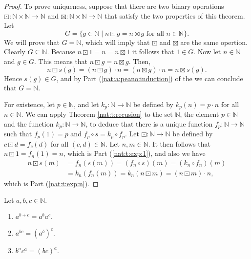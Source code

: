 \begin{proof}
	To prove uniqueness, suppose that there are two binary operations $\boxdot: \mathbb{N} \times \mathbb{N} \to \mathbb{N}$ and $\boxtimes: \mathbb{N} \times \mathbb{N} \to \mathbb{N}$ that satisfy the two properties of this theorem. Let
	\[
		G = \{ g \in \mathbb{N} \mid n \boxdot g = n \boxtimes g \text{ for all } n \in \mathbb{N} \}.
	\]
	We will prove that $G = \mathbb{N}$, which will imply that $\boxdot$ and $\boxtimes$ are the same opertion. Clearly $G \subseteq \mathbb{N}$. Because $n \boxdot 1 = n = n \boxtimes 1$ it follows that $1 \in G$. Now let $n \in \mathbb{N}$ and $g \in G$. This means that $n \boxdot g = n \boxtimes g$. Then,
	\[
		n \boxdot s(g) = (n \boxdot g) \cdot n = (n \boxtimes g) \cdot n = n \boxtimes s(g).
	\]
	Hence $s(g) \in G$, and by Part (\ref{nat:a:peano:induction}) of the  we can conclude that $G = \mathbb{N}$.

	For existence, let $p \in \mathbb{N}$, and let $k_{p}: \mathbb{N} \to \mathbb{N}$ be defined by $k_{p}(n) = p \cdot n$ for all $n \in \mathbb{N}$. We can apply Theorem \ref{nat:t:recusion} to the set $\mathbb{N}$, the element $p \in \mathbb{N}$ and the function $k_{p}: \mathbb{N} \to \mathbb{N}$, to deduce that there is a unique function $f_{p}: \mathbb{N} \to \mathbb{N}$ such that $f_{p}(1) = p$ and $f_{p} \circ s = k_{p} \circ f_{p}$. Let $\boxdot: \mathbb{N} \to \mathbb{N}$ be defined by $c \boxdot d = f_{c}(d)$ for all $(c, d) \in \mathbb{N}$. Let $n, m \in \mathbb{N}$. It then follows that $n \boxdot 1 = f_{n}(1) = n$, which is Part (\ref{nat:t:exp:1}), and also we have
	\begin{align*}
		n \boxdot s(m) & = f_{n}(s(m)) = (f_{n} \circ s)(m) = (k_{n} \circ f_{n})(m)     \\
		               & = k_{n}(f_{n}(m)) = k_{n}(n \boxdot m) = (n \boxdot m) \cdot n,
	\end{align*}
	which is Part (\ref{nat:t:exp:n}).
\end{proof}

\begin{theorem}
	\label{nat:t:exp_props}
	Let $a, b, c \in \mathbb{N}$.
	\begin{enumerate}
		\item \label{nat:t:exp_props:1}
		      $a^{b + c} = a^b a^c$.
		\item \label{nat:t:exp_props:2}
		      $a^{b c} = (a^b)^c$.
		\item \label{nat:t:exp_props:3}
		      $b^a c^a = (b c)^a$.
	\end{enumerate}
\end{theorem}

